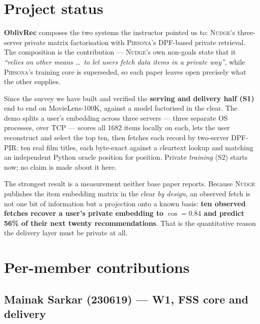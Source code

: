 \date{CS670, IIT Kanpur \quad\textbullet{} September 2026}

\maketitle
\thispagestyle{empty}
\vspace{-2.2em}

\section*{Project status}

\textbf{OblivRec} composes the two systems the instructor pointed us to:
\textsc{Nudge}'s three-server private matrix factorisation with
\textsc{Pirsona}'s DPF-based private retrieval. The composition is the
contribution --- \textsc{Nudge}'s own non-goals state that it \emph{``relies on
other means \ldots\ to let users fetch data items in a private way''}, while
\textsc{Pirsona}'s training core is superseded, so each paper leaves open
precisely what the other supplies.

Since the survey we have built and verified the \textbf{serving and delivery
half (S1)} end to end on MovieLens-100K, against a model factorised in the
clear. The demo splits a user's embedding across three servers --- three
separate OS processes, over TCP --- scores all 1682 items locally on each, lets
the user reconstruct and select the top ten, then fetches each record by
two-server DPF-PIR: ten real film titles, each byte-exact against a cleartext
lookup and matching an independent Python oracle position for position. Private
\emph{training} (S2) starts now; no claim is made about it here.

The strongest result is a measurement neither base paper reports. Because
\textsc{Nudge} publishes the item embedding matrix in the clear \emph{by
design}, an observed fetch is not one bit of information but a projection onto
a known basis: \textbf{ten observed fetches recover a user's private embedding
to $\cos = 0.84$ and predict 56\% of their next twenty recommendations}. That
is the quantitative reason the delivery layer must be private at all.

\section*{Per-member contributions}

\subsection*{Mainak Sarkar (230619) --- W1, FSS core and delivery}

